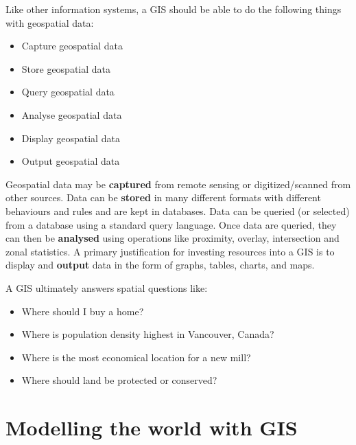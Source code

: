 \documentclass[
]{book}
\providecommand{\tightlist}{%
  \setlength{\itemsep}{0pt}\setlength{\parskip}{0pt}}
\begin{document}
Like other information systems, a GIS should be able to do the following things with geospatial data:

\begin{itemize}
\tightlist
\item
  Capture geospatial data
\item
  Store geospatial data
\item
  Query geospatial data
\item
  Analyse geospatial data
\item
  Display geospatial data
\item
  Output geospatial data
\end{itemize}

Geospatial data may be \textbf{captured} from remote sensing or digitized/scanned from other sources. Data can be \textbf{stored} in many different formats with different behaviours and rules and are kept in databases. Data can be queried (or selected) from a database using a standard query language. Once data are queried, they can then be \textbf{analysed} using operations like proximity, overlay, intersection and zonal statistics. A primary justification for investing resources into a GIS is to display and \textbf{output} data in the form of graphs, tables, charts, and maps.

A GIS ultimately answers spatial questions like:

\begin{itemize}
\tightlist
\item
  Where should I buy a home?
\item
  Where is population density highest in Vancouver, Canada?
\item
  Where is the most economical location for a new mill?
\item
  Where should land be protected or conserved?
\end{itemize}

\section{Modelling the world with GIS}\label{modelling-the-world-with-gis}
\end{document}
